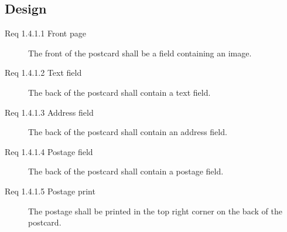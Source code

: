 \documentclass[10pt,a4paper]{article}
\begin{document}
\subsection{Design}
\begin {description}
\item[Req 1.4.1.1 Front page] The front of the postcard shall be a field containing an image.
\item [Req 1.4.1.2 Text field] The back of the postcard shall contain a text field.
\item [Req 1.4.1.3 Address field] The back of the postcard shall contain an address field.
\item [Req 1.4.1.4 Postage field] The back of the postcard shall contain a postage field. 
\item [Req 1.4.1.5 Postage print] The postage shall be printed in the top right corner on the back of the postcard. 


\end{description}
\end{document}
